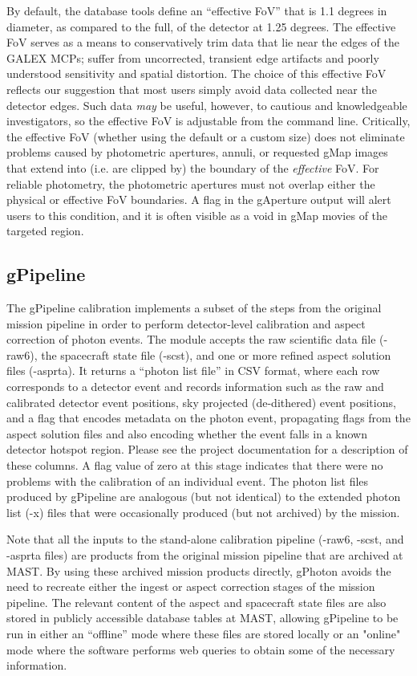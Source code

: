 \documentclass[trackchanges,preprint2]{aastex}
\begin{document}
By default, the database tools define an ``effective FoV'' that is 1.1 degrees in diameter, as compared to the full,  of the detector at 1.25 degrees. The effective FoV serves as a means to conservatively trim data that lie near the edges of the GALEX MCPs;  suffer from uncorrected, transient edge artifacts and poorly understood sensitivity and spatial distortion. The choice of this effective FoV reflects our suggestion that most users simply avoid data collected near the detector edges. Such data \emph{may} be useful, however, to cautious and knowledgeable investigators, so the effective FoV is adjustable from the command line. Critically, the effective FoV (whether using the default or a custom size) does not eliminate problems caused by photometric apertures, annuli, or requested gMap images that extend into (i.e. are clipped by) the boundary of the \emph{effective} FoV. For reliable photometry, the photometric apertures must not overlap either the physical or effective FoV boundaries. A flag in the gAperture output will alert users to this condition, and it is often visible as a void in gMap movies of the targeted region.

\subsection{gPipeline}
The gPipeline calibration implements a subset of the steps from the original mission pipeline in order to perform detector-level calibration and aspect correction of photon events. The module accepts the raw scientific data file (-raw6), the spacecraft state file (-scst), and one or more refined aspect solution files (-asprta). It returns a ``photon list file'' in CSV format, where each row corresponds to a detector event and records information such as the raw and calibrated detector event positions, sky projected (de-dithered) event positions, and a flag that encodes metadata on the photon event, propagating flags from the aspect solution files and also encoding whether the event falls in a known detector hotspot region. Please see the project documentation for a description of these columns. A flag value of zero at this stage indicates that there were no problems with the calibration of an individual event. The photon list files produced by gPipeline are analogous (but not identical) to the extended photon list (-x) files that were occasionally produced (but not archived) by the mission.

Note that all the inputs to the stand-alone calibration pipeline (-raw6, -scst, and -asprta files) are products from the original mission pipeline that are archived at MAST. By using these archived mission products directly, gPhoton avoids the need to recreate either the ingest or aspect correction stages of the mission pipeline. The relevant content of the aspect and spacecraft state files are also stored in publicly accessible database tables at MAST, allowing gPipeline to be run in either an ``offline'' mode where these files are stored locally or an "online" mode where the software performs web queries to obtain some of the necessary information.
\end{document}
